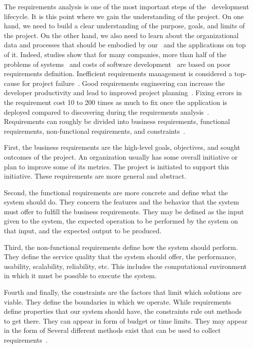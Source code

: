 %
%
The requirements analysis is one of the most important steps of the \db\ development lifecycle.
It is this point where we gain the understanding of the project.
On one hand, we need to build a clear understanding of the purpose, goals, and limits of the project.
On the other hand, we also need to learn about the organizational data and processes that should be embodied by our \db\ and the applications on top of it.
Indeed, studies show that for many companies, more than half of the problems of systems~\cite{Z2003RDARS} and costs of software development~\cite{IC2009BAB2TPTS} are based on poor requirements definition.
Inefficient requirements management is considered a top-cause for project failure~\cite{EDN2005RUIFACI}.
Good requirements engineering can increase the developer productivity and lead to improved project planning~\cite{DCVP2005READSDFFAC}.
Fixing errors in the requirement cost 10 to 200 times as much to fix once the application is deployed compared to discovering during the requirements analysis~\cite{BP1988UACSC,M2001FTEAOOP,RGJ2023EASARBFSAR}.%
%
Requirements can roughly be divided into business requirements, functional requirements, non-functional requirements, and constraints~\cite{I2018SAH}.

First, the business requirements are the high-level goals, objectives, and sought outcomes of the project.
An organization usually has some overall initiative or plan to improve some of its metrics.
The project is initiated to support this initiative.
These requirements are more general and abstract.

Second, the functional requirements are more concrete and define what the system should do.
They concern the features and the behavior that the system must offer to fulfill the business requirements.
They may be defined as the input given to the system, the expected operation to be performed by the system on that input, and the expected output to be produced.

Third, the non-functional requirements define how the system should perform.
They define the service quality that the system should offer, the performance, usability, scalability, reliability, etc.
This includes the computational environment in which it must be possible to execute the system.

Fourth and finally, the constraints are the factors that limit which solutions are viable.
They define the boundaries in which we operate.
While requirements define properties that our system should have, the constraints rule out methods to get there.
They can appear in form of budget or time limits.
They may appear in the form of %
\endhsection%
%
%
%
Several different methods exist that can be used to collect requirements~\cite{Z2003RDARS}.

